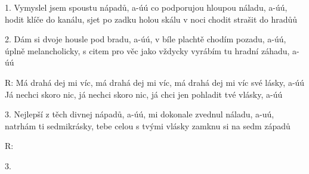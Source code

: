 \resetVars
{}
\MakeHeader
\Lyrics

1. Vymyslel jsem spoustu nápadů, a-úú
co podporujou hloupou náladu, a-úú,
hodit klíče do kanálu,
sjet po zadku holou skálu
v noci chodit strašit do hradůů

2. Dám si dvoje housle pod bradu, a-úú,
v bíle plachtě chodím pozadu, a-úú,
úplně melancholicky,
s citem pro věc jako vždycky
vyrábím tu hradní záhadu, a-úú

R: Má drahá dej mi víc, má drahá dej mi víc,
má drahá dej mi víc své lásky, a-úú
Já nechci skoro nic, já nechci skoro nic,
já chci jen pohladit tvé vlásky, a-úú

3. Nejlepší z těch divnej nápadů, a-úú,
mi dokonale zvednul náladu, a-uú,
natrhám ti sedmikrásky,
tebe celou s tvými vlásky
zamknu si na sedm západů

R:

3.

\Next
